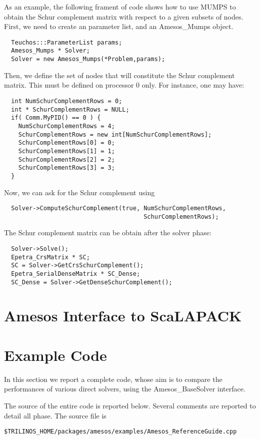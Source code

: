 \documentclass[11pt]{SANDreport}
\begin{document}
\medskip


As an example, the following frament of code shows how to use MUMPS to
obtain the Schur complement matrix with respect to a given subsets of
nodes.  First, we need to create an parameter list, and an Amesos\_Mumps
object.
\begin{verbatim}
  Teuchos:::ParameterList params;
  Amesos_Mumps * Solver;
  Solver = new Amesos_Mumps(*Problem,params);
\end{verbatim}
Then, we define the set of nodes that will constitute the Schur
complement matrix. This must be defined on processor 0 only. For
instance, one may have:
\begin{verbatim}
  int NumSchurComplementRows = 0;
  int * SchurComplementRows = NULL;
  if( Comm.MyPID() == 0 ) {
    NumSchurComplementRows = 4;
    SchurComplementRows = new int[NumSchurComplementRows];
    SchurComplementRows[0] = 0;
    SchurComplementRows[1] = 1; 
    SchurComplementRows[2] = 2;
    SchurComplementRows[3] = 3;
  }
\end{verbatim}
Now, we can ask for the Schur complement using
\begin{verbatim}  
  Solver->ComputeSchurComplement(true, NumSchurComplementRows,
                                       SchurComplementRows);
\end{verbatim}
The Schur complement matrix can be obtain after the solver phase:  
\begin{verbatim}  
  Solver->Solve();
  Epetra_CrsMatrix * SC;
  SC = Solver->GetCrsSchurComplement();
  Epetra_SerialDenseMatrix * SC_Dense;
  SC_Dense = Solver->GetDenseSchurComplement();
\end{verbatim}


\section{Amesos Interface to ScaLAPACK}
\label{sec:scalapack}


\section{Example Code}
\label{sec:comparison}

In this section we report a complete code, whose aim is to compare the
performances of various direct solvers, using the Amesos\_BaseSolver
interface. 

The source of the entire code is reported below. Several comments are
reported to detail all phase. The source file is
\begin{verbatim}
$TRILINOS_HOME/packages/amesos/examples/Amesos_ReferenceGuide.cpp
\end{verbatim}
\end{document}
